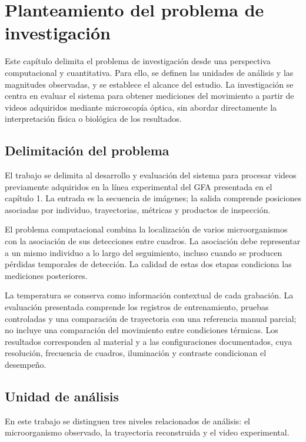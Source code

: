 \chapter{Planteamiento del problema de investigación}

Este capítulo delimita el problema de investigación desde una perspectiva computacional y cuantitativa. Para ello, se definen las unidades de análisis y las magnitudes observadas, y se establece el alcance del estudio. La investigación se centra en evaluar el sistema para obtener mediciones del movimiento a partir de videos adquiridos mediante microscopía óptica, sin abordar directamente la interpretación física o biológica de los resultados.

\section{Delimitación del problema}

El trabajo se delimita al desarrollo y evaluación del sistema para procesar videos previamente adquiridos en la línea experimental del GFA presentada en el capítulo 1. La entrada es la secuencia de imágenes; la salida comprende posiciones asociadas por individuo, trayectorias, métricas y productos de inspección.

El problema computacional combina la localización de varios microorganismos con la asociación de sus detecciones entre cuadros. La asociación debe representar a un mismo individuo a lo largo del seguimiento, incluso cuando se producen pérdidas temporales de detección. La calidad de estas dos etapas condiciona las mediciones posteriores.

La temperatura se conserva como información contextual de cada grabación. La evaluación presentada comprende los registros de entrenamiento, pruebas controladas y una comparación de trayectoria con una referencia manual parcial; no incluye una comparación del movimiento entre condiciones térmicas. Los resultados corresponden al material y a las configuraciones documentados, cuya resolución, frecuencia de cuadros, iluminación y contraste condicionan el desempeño.

\section{Unidad de análisis}

En este trabajo se distinguen tres niveles relacionados de análisis: el microorganismo observado, la trayectoria reconstruida y el video experimental.

